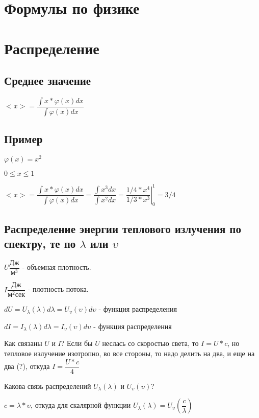 \documentclass[15pt]{extarticle}
\begin{document}
\section*{Формулы по физике}

\section{Распределение}

\subsection{Среднее значение}

$<x> = \dfrac{\int{x * \varphi (x) dx}} {\int{\varphi (x) dx}}$

\subsection{Пример}

$\varphi (x) = x^2$

$0 \le x \le 1$

$<x> = \dfrac{\int{x * \varphi (x) dx}} {\int{\varphi (x) dx}} = \dfrac{\int{x^3 dx}} {\int{x^2 dx}} =  \left.\dfrac{1/4 * x^4} {1/3 * x^3} \right\vert_0^1 = 3/4$

\subsection{Распределение энергии теплового излучения по спектру, те по $\lambda$ или $\upsilon$}


$U \dfrac{\text{Дж}}{\text{м}^3}$ - объемная плотность.

$I \dfrac{\text{Дж}}{\text{м}^2 \text{сек}}$ - плотность потока.

$dU = U_{\lambda}(\lambda) d \lambda = U_{\upsilon}(\upsilon) d \upsilon$  - функция распределения

$dI = I_{\lambda}(\lambda) d \lambda = I_{\upsilon}(\upsilon) d \upsilon$  - функция распределения

Как связаны $U$ и $I$? Если бы $U$ неслась со скоростью света, то $I = U * c$, но тепловое излучение изотропно, во все стороны, то надо делить на два, и еще на два (?), откуда $I = \dfrac{U * c}{4} $

Какова связь распределений $U_{\lambda}(\lambda)$ и $U_{\upsilon}(\upsilon)$? 

$c = \lambda * \upsilon$, откуда для скалярной функции $U_{\lambda}(\lambda) = U_{\upsilon}(\dfrac{c}{\lambda})$
\end{document}
